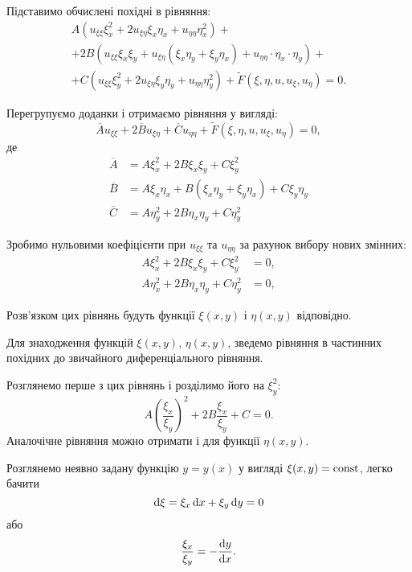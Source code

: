 Підставимо обчислені похідні в рівняння:
\begin{multline}
	A (u_{\xi\xi} \xi_x^2 + 2 u_{\xi\eta} \xi_x \eta_x + u_{\eta\eta} \eta_x^2 ) + \\
	+ 2 B(u_{\xi\xi} \xi_x \xi_y + u_{\xi\eta}(\xi_x\eta_y+\xi_y\eta_x)+u_{\eta\eta}\cdot\eta_x\cdot\eta_y) + \\
	+ C (u_{\xi\xi} \xi_y^2 + 2 u_{\xi\eta}\xi_y\eta_y + u_{\eta\eta}\eta_y^2) + \widetilde{F}(\xi, \eta, u, u_\xi, u_\eta) = 0.
\end{multline}

Перегрупуємо доданки і отримаємо рівняння у вигляді:
\begin{equation}
	\overline{A} u_{\xi\xi} + 2\overline{B}u_{\xi\eta} + \overline{C} u_{\eta\eta} + \widetilde{F}(\xi,\eta,u,u_\xi,u_\eta)=0,
\end{equation}
де 
\begin{align}
	\overline{A} &= A \xi_x^2 + 2 B \xi_x \xi_y + C \xi_y^2 \\
	\overline{B} &= A \xi_x \eta_x + B(\xi_x \eta_y + \xi_y \eta_x) + C \xi_y \eta_y \\
	\overline{C} &= A \eta_y^2 + 2 B \eta_x \eta_y + C \eta_y^2
\end{align}

Зробимо нульовими коефіцієнти при $u_{\xi\xi}$ та $u_{\eta\eta}$ за рахунок вибору нових змінних:
\begin{align}
	A \xi_x^2 + 2 B \xi_x \xi_y + C \xi_y^2 &= 0, \\
	A \eta_x^2 + 2 B \eta_x \eta_y + C \eta_y^2 &= 0,
\end{align}

Розв'язком цих рівнянь будуть функції $\xi(x,y)$ і $\eta(x,y)$ відповідно. \medskip

Для знаходження функцій $\xi(x, y)$, $\eta(x,y)$, зведемо рівняння в частинних похідних до звичайного диференціального рівняння. \medskip

Розглянемо перше з цих рівнянь і розділимо його на $\xi_y^2$:
\begin{equation}
	A \left( \dfrac{\xi_x}{\xi_y} \right)^2 + 2 B \dfrac{\xi_x}{\xi_y} + C = 0.
\end{equation}
Аналочічне рівняння можно отримати і для функції  $\eta(x,y)$.

Розглянемо неявно задану функцію $y = y(x)$ у вигляді $\xi(x, y) = \operatorname{const}$, легко бачити
\begin{equation}
	\mathop{}\!\mathrm{d} \xi = \xi_x \mathop{}\!\mathrm{d} x + \xi_y \mathop{}\!\mathrm{d} y = 0
\end{equation}
або
\begin{equation}
	\dfrac{\xi_x}{\xi_y} = - \dfrac{\mathop{}\!\mathrm{d} y}{\mathop{}\!\mathrm{d} x}.
\end{equation}

